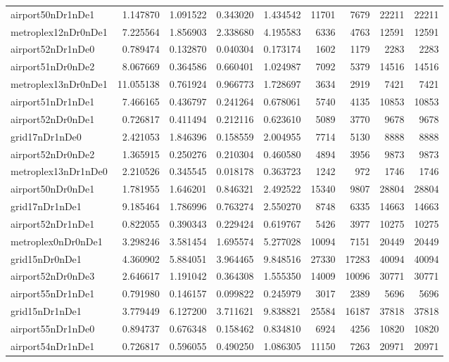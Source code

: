 \begin{longtable}{|l|r|r|r|r|r|r|r|r|}
airport50nDr1nDe1 & 1.147870 & 1.091522 & 0.343020 & 1.434542 & 11701 & 7679 & 22211 & 22211 \\
metroplex12nDr0nDe1 & 7.225564 & 1.856903 & 2.338680 & 4.195583 & 6336 & 4763 & 12591 & 12591 \\
airport52nDr1nDe0 & 0.789474 & 0.132870 & 0.040304 & 0.173174 & 1602 & 1179 & 2283 & 2283 \\
airport51nDr0nDe2 & 8.067669 & 0.364586 & 0.660401 & 1.024987 & 7092 & 5379 & 14516 & 14516 \\
metroplex13nDr0nDe1 & 11.055138 & 0.761924 & 0.966773 & 1.728697 & 3634 & 2919 & 7421 & 7421 \\
airport51nDr1nDe1 & 7.466165 & 0.436797 & 0.241264 & 0.678061 & 5740 & 4135 & 10853 & 10853 \\
airport52nDr0nDe1 & 0.726817 & 0.411494 & 0.212116 & 0.623610 & 5089 & 3770 & 9678 & 9678 \\
grid17nDr1nDe0 & 2.421053 & 1.846396 & 0.158559 & 2.004955 & 7714 & 5130 & 8888 & 8888 \\
airport52nDr0nDe2 & 1.365915 & 0.250276 & 0.210304 & 0.460580 & 4894 & 3956 & 9873 & 9873 \\
metroplex13nDr1nDe0 & 2.210526 & 0.345545 & 0.018178 & 0.363723 & 1242 & 972 & 1746 & 1746 \\
airport50nDr0nDe1 & 1.781955 & 1.646201 & 0.846321 & 2.492522 & 15340 & 9807 & 28804 & 28804 \\
grid17nDr1nDe1 & 9.185464 & 1.786996 & 0.763274 & 2.550270 & 8748 & 6335 & 14663 & 14663 \\
airport52nDr1nDe1 & 0.822055 & 0.390343 & 0.229424 & 0.619767 & 5426 & 3977 & 10275 & 10275 \\
metroplex0nDr0nDe1 & 3.298246 & 3.581454 & 1.695574 & 5.277028 & 10094 & 7151 & 20449 & 20449 \\
grid15nDr0nDe1 & 4.360902 & 5.884051 & 3.964465 & 9.848516 & 27330 & 17283 & 40094 & 40094 \\
airport52nDr0nDe3 & 2.646617 & 1.191042 & 0.364308 & 1.555350 & 14009 & 10096 & 30771 & 30771 \\
airport55nDr1nDe1 & 0.791980 & 0.146157 & 0.099822 & 0.245979 & 3017 & 2389 & 5696 & 5696 \\
grid15nDr1nDe1 & 3.779449 & 6.127200 & 3.711621 & 9.838821 & 25584 & 16187 & 37818 & 37818 \\
airport55nDr1nDe0 & 0.894737 & 0.676348 & 0.158462 & 0.834810 & 6924 & 4256 & 10820 & 10820 \\
airport54nDr1nDe1 & 0.726817 & 0.596055 & 0.490250 & 1.086305 & 11150 & 7263 & 20971 & 20971 \\

\end{longtable}
